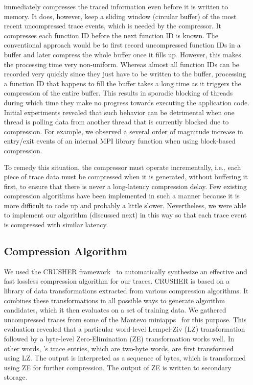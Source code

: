 \parlot immediately compresses the traced information even before it is written to memory. It does, however, keep a sliding window (circular buffer) of the most recent uncompressed trace events, which is needed by the compressor. It compresses each function ID before the next function ID is known. The conventional approach would be to first record uncompressed function IDs in a buffer and later compress the whole buffer once it fills up. However, this makes the processing time very non-uniform. Whereas almost all function IDs can be recorded very quickly since they just have to be written to the buffer, processing a function ID that happens to fill the buffer takes a long time as it triggers the compression of the entire buffer. This results in sporadic blocking of threads during which time they make no progress towards executing the application code. Initial experiments revealed that such behavior can be detrimental when one thread is polling data from another thread that is currently blocked due to compression. For example, we observed a several order of magnitude increase in entry/exit events of an internal MPI library function when using block-based compression.

To remedy this situation, the compressor must operate incrementally, i.e., each piece of trace data must be compressed when it is generated, without buffering it first, to ensure that there is never a long-latency compression delay. Few existing compression algorithms have been implemented in such a manner because it is more difficult to code up and probably a little slower. Nevertheless, we were able to implement our algorithm (discussed next) in this way so that each trace event is compressed with similar latency.


\subsection{Compression Algorithm}
\label{subsec:compAlg}

We used the CRUSHER framework~\cite{mb-cluster15, mb-space16, mb-sc16, mb-dcc18} to automatically synthesize an effective and fast lossless compression algorithm for our traces. CRUSHER is based on a library of data transformations extracted from various compression algorithms. It combines these transformations in all possible ways to generate algorithm candidates, which it then evaluates on a set of training data. We gathered uncompressed traces from some of the Mantevo miniapps~\cite{mantevo} for this purpose. This evaluation revealed that a particular word-level Lempel-Ziv (LZ) transformation followed by a byte-level Zero-Elimination (ZE) transformation works well. In other words, \parlot 's trace entries, which are two-byte words, are first transformed using LZ. The output is interpreted as a sequence of bytes, which is transformed using ZE for further compression. The output of ZE is written to secondary storage.

